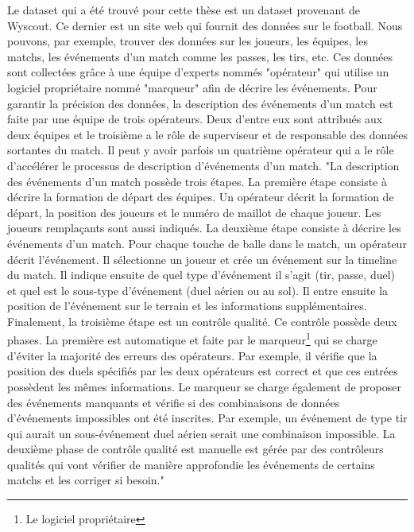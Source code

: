 \documentclass[12pt]{article}
\begin{document}
Le dataset qui a été trouvé pour cette thèse est un dataset provenant de Wyscout. 
Ce dernier est un site web qui fournit des données sur le football. 
Nous pouvons, par exemple, trouver des données sur les joueurs, les équipes, les matchs, les événements d'un match comme les passes, les tirs, etc.
Ces données sont collectées grâce à une équipe d'experts nommés "opérateur" qui utilise un logiciel propriétaire nommé "marqueur" afin de décrire les événements.
Pour garantir la précision des données, la description des événements d'un match est faite par une équipe de trois opérateurs. 
Deux d'entre eux sont attribués aux deux équipes et le troisième a le rôle de superviseur et de responsable des données sortantes du match. \cite{pappalardoPublicDataSet2019} 
Il peut y avoir parfois un quatrième opérateur qui a le rôle d'accélérer le processus de description d'événements d'un match. 
\newline\newline
"La description des événements d'un match possède trois étapes.
La première étape consiste à décrire la formation de départ des équipes. 
Un opérateur décrit la formation de départ, la position des joueurs et le numéro de maillot de chaque joueur. Les joueurs remplaçants sont aussi indiqués. 
La deuxième étape consiste à décrire les événements d'un match.
Pour chaque touche de balle dans le match, un opérateur décrit l'événement. 
Il sélectionne un joueur et crée un événement sur la timeline du match.
Il indique ensuite de quel type d'événement il s'agit (tir, passe, duel) et quel est le sous-type d'événement (duel aérien ou au sol).
Il entre ensuite la position de l'événement sur le terrain et les informations supplémentaires.
Finalement, la troisième étape est un contrôle qualité.
Ce contrôle possède deux phases. 
La première est automatique et faite par le marqueur\footnote{Le logiciel propriétaire} qui se charge d'éviter la majorité des erreurs des opérateurs.
Par exemple, il vérifie que la position des duels spécifiés par les deux opérateurs est correct et que ces entrées possèdent les mêmes informations.
Le marqueur se charge également de proposer des événements manquants et vérifie si des combinaisons de données d'événements impossibles ont été inscrites.
Par exemple, un événement de type tir qui aurait un sous-événement duel aérien serait une combinaison impossible.
La deuxième phase de contrôle qualité est manuelle est gérée par des contrôleurs qualités qui vont vérifier de manière approfondie les événements de certains matchs et les corriger si besoin." \cite{pappalardoPublicDataSet2019}
\end{document}

